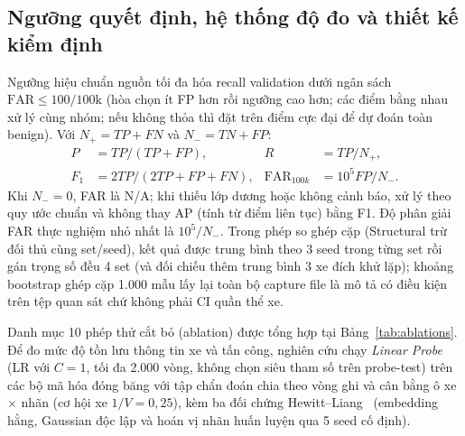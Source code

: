 \documentclass[12pt, a4paper, reqno, oneside]{book}
\begin{document}
\subsection{Ngưỡng quyết định, hệ thống độ đo và thiết kế kiểm định}
Ngưỡng hiệu chuẩn nguồn tối đa hóa recall validation dưới ngân sách $\text{FAR} \le 100/100\text{k}$ (hòa chọn ít FP hơn rồi ngưỡng cao hơn; các điểm bằng nhau xử lý cùng nhóm; nếu không thỏa thì đặt trên điểm cực đại để dự đoán toàn benign). Với $N_+=TP+FN$ và $N_-=TN+FP$:
\begin{align}
P&=TP/(TP+FP), & R&=TP/N_+,\\
F_1&=2TP/(2TP+FP+FN), & \operatorname{FAR}_{100k}&=10^5FP/N_-.
\end{align}
Khi $N_-=0$, FAR là N/A; khi thiếu lớp dương hoặc không cảnh báo, xử lý theo quy ước chuẩn và không thay AP (tính từ điểm liên tục) bằng F1. Độ phân giải FAR thực nghiệm nhỏ nhất là $10^5/N_-$. Trong phép so ghép cặp (Structural trừ đối thủ cùng set/seed), kết quả được trung bình theo 3 seed trong từng set rồi gán trọng số đều 4 set (và đối chiếu thêm trung bình 3 xe đích khử lặp); khoảng bootstrap ghép cặp 1.000 mẫu lấy lại toàn bộ capture file là mô tả có điều kiện trên tệp quan sát chứ không phải CI quần thể xe.

Danh mục 10 phép thử cắt bỏ (ablation) được tổng hợp tại Bảng~\ref{tab:ablations}. Để đo mức độ tồn lưu thông tin xe và tấn công, nghiên cứu chạy \textit{Linear Probe} (LR với $C=1$, tối đa 2.000 vòng, không chọn siêu tham số trên probe-test) trên các bộ mã hóa đóng băng với tập chẩn đoán chia theo vòng ghi và cân bằng ô xe $\times$ nhãn (cơ hội xe $1/V=0{,}25$), kèm ba đối chứng Hewitt--Liang~\cite{hewitt2019probes} (embedding hằng, Gaussian độc lập và hoán vị nhãn huấn luyện qua 5 seed cố định).
\end{document}

